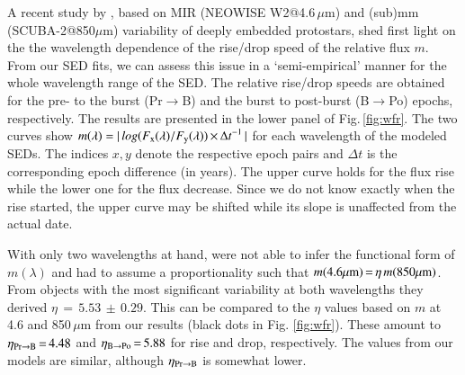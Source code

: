 A recent study by \citet{10.1093/mnras/staa1254}, based on MIR (NEOWISE W2@4.6\,$\mu$m) and (sub)mm (SCUBA-2@850$\mu$m) variability of deeply embedded protostars, shed first light on the the wavelength dependence of the  rise/drop speed of the relative flux $m$. From our SED fits, we can assess this issue in a `semi-empirical' manner for the whole wavelength range of the SED. The relative rise/drop speeds are obtained for the pre- to the burst (Pr$\to$B) and the burst to post-burst (B$\to$Po) epochs, respectively. The results are presented in the lower panel of Fig.\,\ref{fig:wfr}. The two curves show $m(\lambda)=|\,log(F_{\rm x}(\lambda)/F_{\rm y}(\lambda))\,{\times}\,{\Delta t}^{-1}\,|$ for each wavelength of the modeled SEDs. The indices $x, y$ denote the respective epoch pairs and $\Delta t$ is the
corresponding epoch difference (in years). 
The upper curve holds for the flux rise while the lower one for the flux decrease. Since we do not know exactly when the rise started, the upper curve may be shifted while its slope is unaffected from the actual date.

With only two wavelengths at hand, \citet{10.1093/mnras/staa1254} were not able to infer the functional form of $m(\lambda)$ and had to assume a proportionality such that $m({\rm 4.6\mu m})\,{=}\,\eta\, m({\rm 850\mu m})$. From objects with the most significant variability at both wavelengths they derived $\eta\,{=}\,5.53\,{\pm}\,0.29$. This can be compared to the $\eta$ values based on $m$ at 4.6 and 850\,$\mu$m from our results (black dots in Fig. \ref{fig:wfr}). These amount to $\eta_{\rm Pr \to B}\,{=}\,4.48$ and $\eta_{\rm B\to Po}\,{=}\,5.88$ for rise and drop, respectively. The values from our models are similar, although $\eta_{\rm Pr \to B}$ is somewhat lower.

